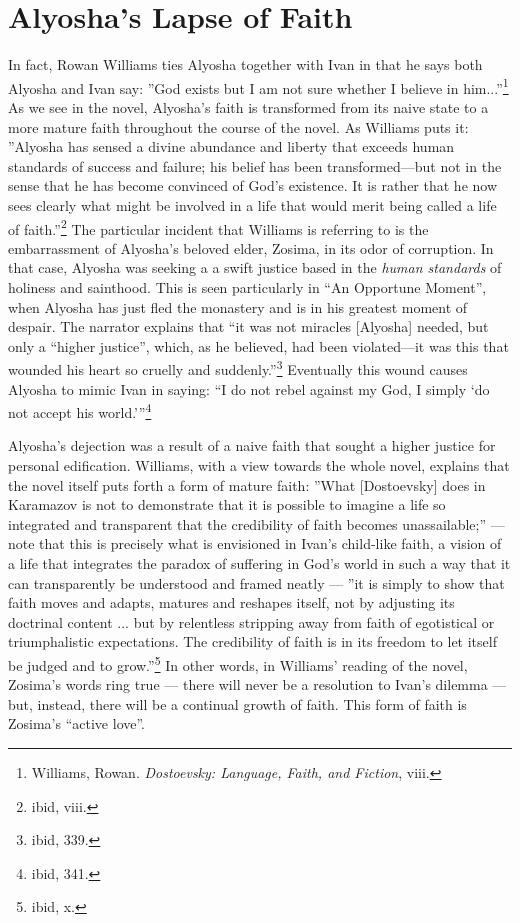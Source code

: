 	\section{Alyosha's Lapse of Faith}
	In fact, Rowan Williams ties Alyosha together with Ivan in that he says both Alyosha and Ivan say: ''God exists but I am not sure whether I believe in him...''\footnote{Williams, Rowan. \emph{Dostoevsky: Language, Faith, and Fiction}, viii.} As we see in the novel, Alyosha's faith is transformed from its naive state to a more mature faith throughout the course of the novel. As Williams puts it: ''Alyosha has sensed a divine abundance and liberty that exceeds human standards of success and failure; his belief has been transformed---but not in the sense that he has become convinced of God's existence. It is rather that he now sees clearly what might be involved in a life that would merit being called a life of faith.''\footnote{ibid, viii.} The particular incident that Williams is referring to is the embarrassment of Alyosha's beloved elder, Zosima, in its odor of corruption. In that case, Alyosha was seeking a a swift justice based in the \emph{human standards} of holiness and sainthood. This is seen particularly in ``An Opportune Moment'', when Alyosha has just fled the monastery and is in his greatest moment of despair. The narrator explains that ``it was not miracles [Alyosha] needed, but only a ``higher justice'', which, as he believed, had been violated---it was this that wounded his heart so cruelly and suddenly.''\footnote{ibid, 339.} Eventually this wound causes Alyosha to mimic Ivan in saying: ``I do not rebel against my God, I simply `do not accept his world.'''\footnote{ibid, 341.}
	
	Alyosha's dejection was a result of a naive faith that sought a higher justice for personal edification. Williams, with a view towards the whole novel, explains that the novel itself puts forth a form of mature faith:
	''What [Dostoevsky] does in Karamazov is not to demonstrate that it is possible to imagine a life so integrated and transparent that the credibility of faith becomes unassailable;'' --- note that this is precisely what is envisioned in Ivan's child-like faith, a vision of a life that integrates the paradox of suffering in God's world in such a way that it can transparently be understood and framed neatly --- ''it is simply to show that faith moves and adapts, matures and reshapes itself, not by adjusting its doctrinal content ... but by relentless stripping away from faith of egotistical or triumphalistic expectations. The credibility of faith is in its freedom to let itself be judged and to grow.''\footnote{ibid, x.} In other words, in Williams' reading of the novel, Zosima's words ring true --- there will never be a resolution to Ivan's dilemma --- but, instead, there will be a continual growth of faith. This form of faith is Zosima's ``active love''.
	
